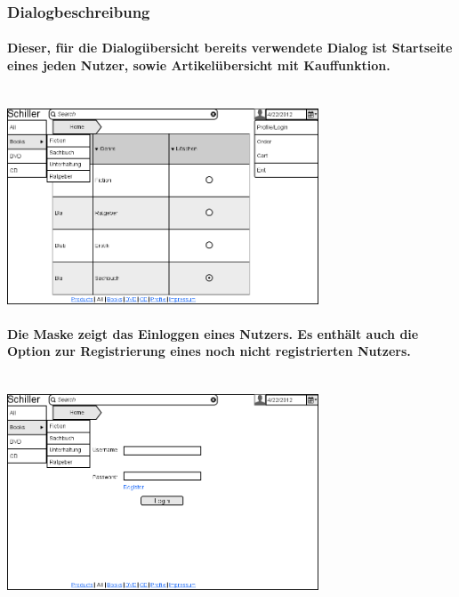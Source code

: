 \documentclass[a4paper]{article}
\begin{document}
\subsubsection{Dialogbeschreibung}

\paragraph{Dieser, für die Dialogübersicht bereits verwendete Dialog ist Startseite eines jeden Nutzer, sowie Artikelübersicht mit Kauffunktion.\\ \\}
\includegraphics[width=350px]{1Home_Costumer.png}

\paragraph{Die Maske zeigt das Einloggen eines Nutzers. Es enthält auch die Option zur Registrierung eines noch nicht registrierten Nutzers.\\ \\}
\includegraphics[width=350px]{2Login.png}
\end{document}
